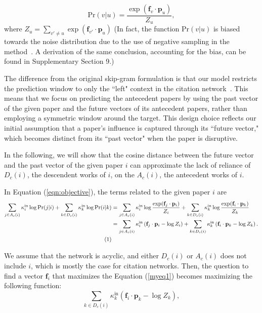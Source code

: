 \documentclass[12pt]{article}
\begin{document}
\begin{refsection}
\[
    \text{Pr} (v|u) = \frac{ \exp({\mathbf{f}_v \cdot \mathbf{p}_u})} {Z_u},
\]
where $Z_u = \sum_{v' \neq u} \exp{(\mathbf{f}_{v'}\cdot\mathbf{p}_u)}$ (In fact, the function $\text{Pr}(v|u)$ is biased towards the noise distribution due to the use of negative sampling in the method~\cite{kojaku2021residual2vec}.  A derivation of the same conclusion, accounting for the bias, can be found in Supplementary Section 9.)

The difference from the original skip-gram formulation is that our model restricts the prediction window to only the ``left" context in the citation network~\cite{song2018directional}. This means that we focus on predicting the antecedent papers by using the past vector of the given paper and the future vectors of its antecedent papers, rather than employing a symmetric window around the target. This design choice reflects our initial assumption that a paper's influence is captured through its ``future vector," which becomes distinct from its ``past vector" when the paper is disruptive.

In the following, we will show that the cosine distance between the future vector and the past vector of the given paper $i$ can approximate the lack of reliance of $D_c(i)$, the descendent works of $i$, on the $A_c(i)$, the antecedent works of $i$.

 
In Equation (\ref{eqn:objective}), the terms related to the given paper $i$ are
\begin{align*}
  \sum_{j\in A_c(i)} \kappa_i^{\text{in}}\log \text{Pr}(j | i) + \sum_{k \in D_c(i)} \kappa_{k}^{\text{in}}\log \text{Pr}(i | k) & =  \sum_{j\in A_c(i)}  \kappa_i^{\text{in}}\log \frac{ \exp({\mathbf{f}_j \cdot \mathbf{p}_i})} {Z_i} + \sum_{k\in D_c(i)} \kappa_{k}^{\text{in}}\log \frac{ \exp({\mathbf{f}_i \cdot \mathbf{p}_k})} {Z_{k}} \\
  & =  \sum_{j\in A_c(i)} \kappa_i^{\text{in}} \left({\mathbf{f}_j \cdot \mathbf{p}_i} - \log {Z_i}\right) +  \sum_{k\in D_c(i)}\kappa_{k}^{\text{in}}\left(\mathbf{f}_i \cdot \mathbf{p}_k -\log {Z_{k}}\right).\\
 \stepcounter{equation}\tag{\theequation}\label{myeq1}
\end{align*}

We assume that the network is acyclic, and either $D_c(i)$ or $A_c(i)$ does not include $i$, which is mostly the case for citation networks. Then, the question to find a vector $\mathbf{f}_i$ that maximizes the Equation (\ref{myeq1}) becomes maximizing the following function: 
\[
     \sum_{k \in D_c(i)} \kappa_k^{\text{in}} (\mathbf{f}_i \cdot \mathbf{p}_k - \log Z_k),
\]


\end{refsection}
\end{document}
